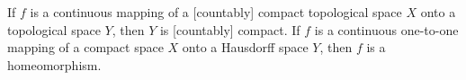If $f$ is a continuous mapping of a [countably] compact topological space $X$ onto a topological space $Y$, then $Y$ is [countably] compact. If $f$ is a continuous one-to-one mapping of a compact space $X$ onto a Hausdorff space $Y$, then $f$ is a homeomorphism.
